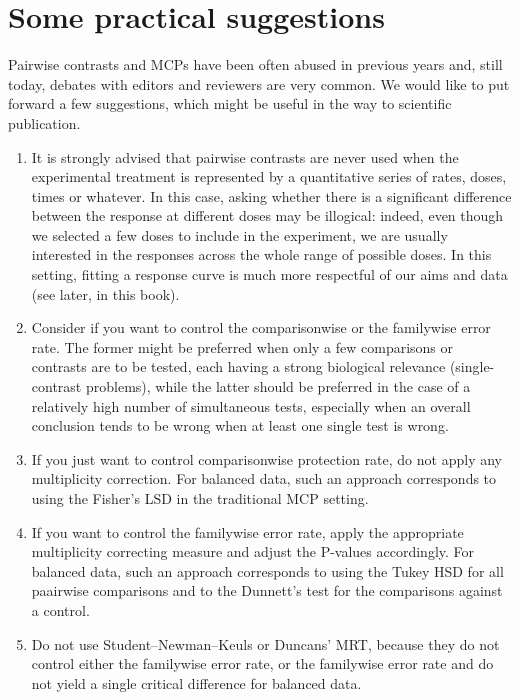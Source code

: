 \documentclass[a4paper,12pt,oneside]{book}
\providecommand{\tightlist}{%
  \setlength{\itemsep}{0pt}\setlength{\parskip}{0pt}}
\begin{document}
\hypertarget{some-practical-suggestions}{%
\section{Some practical suggestions}\label{some-practical-suggestions}}

Pairwise contrasts and MCPs have been often abused in previous years and, still today, debates with editors and reviewers are very common. We would like to put forward a few suggestions, which might be useful in the way to scientific publication.

\begin{enumerate}
\def\labelenumi{\arabic{enumi}.}
\tightlist
\item
  It is strongly advised that pairwise contrasts are never used when the experimental treatment is represented by a quantitative series of rates, doses, times or whatever. In this case, asking whether there is a significant difference between the response at different doses may be illogical: indeed, even though we selected a few doses to include in the experiment, we are usually interested in the responses across the whole range of possible doses. In this setting, fitting a response curve is much more respectful of our aims and data (see later, in this book).
\item
  Consider if you want to control the comparisonwise or the familywise error rate. The former might be preferred when only a few comparisons or contrasts are to be tested, each having a strong biological relevance (single-contrast problems), while the latter should be preferred in the case of a relatively high number of simultaneous tests, especially when an overall conclusion tends to be wrong when at least one single test is wrong.
\item
  If you just want to control comparisonwise protection rate, do not apply any multiplicity correction. For balanced data, such an approach corresponds to using the Fisher's LSD in the traditional MCP setting.
\item
  If you want to control the familywise error rate, apply the appropriate multiplicity correcting measure and adjust the P-values accordingly. For balanced data, such an approach corresponds to using the Tukey HSD for all paairwise comparisons and to the Dunnett's test for the comparisons against a control.
\item
  Do not use Student--Newman--Keuls or Duncans' MRT, because they do not control either the familywise error rate, or the familywise error rate and do not yield a single critical difference for balanced data.
\end{enumerate}
\end{document}
